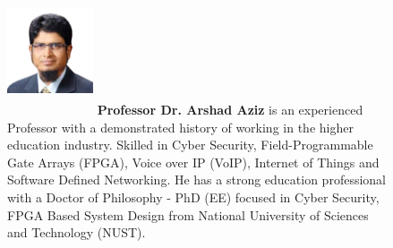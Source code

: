 \documentclass{article}
\begin{document}
\begin{figure}[h]
\includegraphics[width=1in,height=1.5in,clip,keepaspectratio]{img/Arshad-Aziz.png}
\textbf{Professor Dr. Arshad Aziz} is an experienced Professor with a demonstrated history of working in the higher education industry. Skilled in Cyber Security, Field-Programmable Gate Arrays (FPGA), Voice over IP (VoIP), Internet of Things and Software Defined Networking. He has a strong education professional with a Doctor of Philosophy - PhD (EE) focused in Cyber Security, FPGA Based System Design from National University of Sciences and Technology (NUST).
\end{figure}
\vfill
 

 
\clearpage \newpage










\end{document}

